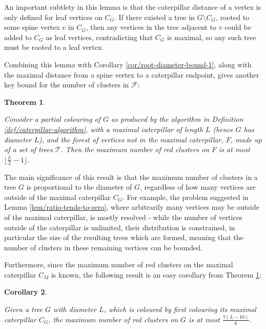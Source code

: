 \documentclass{mpaper}
\newtheorem{theorem}{Theorem}[section]
\newtheorem{corollary}[theorem]{Corollary}
\begin{document}
An important subtlety in this lemma is that the caterpillar distance of a vertex is only defined for leaf vertices on $C_G$. If there existed a tree in $G \setminus C_G$, rooted to some spine vertex $v$ in $C_G$, then any vertices in the tree adjacent to $v$ could be added to $C_G$ as leaf vertices, contradicting that $C_G$ is maximal, so any such tree must be rooted to a leaf vertex.

Combining this lemma with Corollary \ref{cor/root-diameter-bound-1}, along with the maximal distance from a spine vertex to a caterpillar endpoint, gives another key bound for the number of clusters in $\mathcal{F}$:

\begin{theorem}
\label{thm/root-diameter-bound-2}

Consider a partial colouring of $G$ as produced by the algorithm in Definition \ref{def/caterpillar-algorithm}, with a maximal caterpillar of length $L$ (hence $G$ has diameter $L$), and the forest of vertices not in the maximal caterpillar, $F$,  made up of a set of trees $\mathcal{T}$. Then the maximum number of red clusters on $F$ is at most $\lfloor \frac{L}{2} - 1 \rfloor$.

\end{theorem}

The main significance of this result is that the maximum number of clusters in a tree $G$ is proportional to the diameter of $G$, regardless of how many vertices are outside of the maximal caterpillar $C_G$. For example, the problem suggested in Lemma \ref{lem/ratio-tends-to-zero}, where arbitrarily many vertices may be outside of the maximal caterpillar, is mostly resolved - while the number of vertices outside of the caterpillar is unlimited, their distribution is constrained, in particular the size of the resulting trees which are formed, meaning that the number of clusters in these remaining vertices can be bounded.

Furthermore, since the maximum number of red clusters on the maximal caterpillar $C_M$ is known, the following result is an easy corollary from Theorem \ref{thm/root-diameter-bound-2}:

\begin{corollary}
\label{cor/diameter_bound_full}

Given a tree $G$ with diameter $L$, which is coloured by first colouring its maximal caterpillar $C_G$, the maximum number of red clusters on $G$ is at most $\frac{7(L-10)}{6}$.
\end{corollary}
\end{document}
